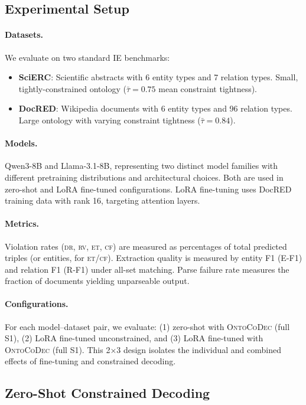 \documentclass[11pt,a4paper]{article}
\newcommand{\sys}{\textsc{OntoCoDec}}
\newcommand{\DR}{\textsc{dr}}
\newcommand{\RV}{\textsc{rv}}
\newcommand{\ET}{\textsc{et}}
\newcommand{\CF}{\textsc{cf}}
\begin{document}
\subsection{Experimental Setup}

\paragraph{Datasets.}
We evaluate on two standard IE benchmarks:
\begin{itemize}[nosep,leftmargin=*]
    \item \textbf{SciERC}: Scientific abstracts with 6 entity types and 7 relation types. Small, tightly-constrained ontology ($\bar{\tau}=0.75$ mean constraint tightness).
    \item \textbf{DocRED}: Wikipedia documents with 6 entity types and 96 relation types. Large ontology with varying constraint tightness ($\bar{\tau}=0.84$).
\end{itemize}

\paragraph{Models.}
Qwen3-8B and Llama-3.1-8B, representing two distinct model families with different pretraining distributions and architectural choices. Both are used in zero-shot and LoRA fine-tuned configurations. LoRA fine-tuning uses DocRED training data with rank 16, targeting attention layers.

\paragraph{Metrics.}
Violation rates (\DR{}, \RV{}, \ET{}, \CF{}) are measured as percentages of total predicted triples (or entities, for \ET{}/\CF{}). Extraction quality is measured by entity F1 (E-F1) and relation F1 (R-F1) under all-set matching. Parse failure rate measures the fraction of documents yielding unparseable output.

\paragraph{Configurations.}
For each model--dataset pair, we evaluate: (1) zero-shot with \sys{} (full S1), (2) LoRA fine-tuned unconstrained, and (3) LoRA fine-tuned with \sys{} (full S1). This 2$\times$3 design isolates the individual and combined effects of fine-tuning and constrained decoding.

\subsection{Zero-Shot Constrained Decoding}
\label{sec:zeroshot}
\end{document}
